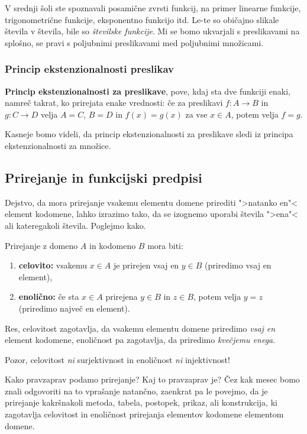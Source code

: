 V srednji šoli ste spoznavali posamične zvrsti funkcij, na primer linearne funkcije, trigonometrične funkcije, eksponentno funkcijo itd. Le-te so običajno slikale števila v števila, bile so \emph{številske funkcije}. Mi se bomo ukvarjali s preslikavami na splošno, se pravi s poljubnimi preslikavami med poljubnimi množicami.

\subsubsection{Princip ekstenzionalnosti preslikav}

\textbf{Princip ekstenzionalnosti za preslikave}, pove, kdaj sta dve funkciji enaki, namreč takrat, ko prirejata enake vrednosti:  če za preslikavi $f : A \to B$ in $g : C \to D$ velja $A = C$, $B = D$ in $f(x) = g(x)$ za vse $x \in A$, potem velja $f = g$.

Kasneje bomo videli, da princip ekstenzionalnosti za preslikave sledi iz principa ekstenzionalnosti za množice.

\subsection{Prirejanje in funkcijski predpisi}

Dejstvo, da mora prirejanje vsakemu elementu domene prirediti ">natanko en"< element kodomene, lahko izrazimo tako, da se izognemo uporabi števila ">ena"< ali kateregakoli števila. Poglejmo kako.

Prirejanje z domeno $A$ in kodomeno $B$ mora biti:
%
\begin{enumerate}
\item \textbf{celovito:} vsakemu $x \in A$ je prirejen vsaj en $y \in B$ (priredimo vsaj en element),
\item \textbf{enolično:} če sta $x \in A$ prirejena $y \in B$ in $z \in B$, potem velja $y = z$ (priredimo največ en element).
\end{enumerate}
%
Res, celovitost zagotavlja, da vsakemu elementu domene priredimo \emph{vsaj en} element kodomene, enoličnost pa zagotavlja, da priredimo \emph{kvečjemu enega}.

\begin{opomba}
  Pozor, celovitost \emph{ni} surjektivnost in enoličnost \emph{ni} injektivnost!
\end{opomba}

Kako pravzaprav podamo prirejanje? Kaj to pravzaprav je? Čez kak mesec bomo znali odgovoriti na to vprašanje natančno, zaenkrat pa le povejmo, da je prirejanje kakršnakoli metoda, tabela, postopek, prikaz, ali konstrukcija, ki zagotavlja celovitost in enoličnost prirejanja elementov kodomene elementom domene.

